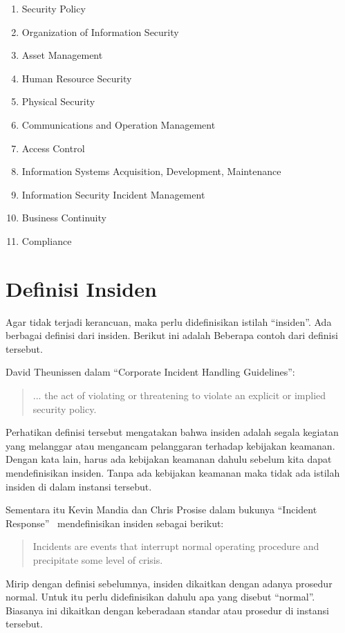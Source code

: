 \begin{enumerate}
\item Security Policy
\item Organization of Information Security
\item Asset Management
\item Human Resource Security
\item Physical Security
\item Communications and Operation Management
\item Access Control
\item Information Systems Acquisition, Development, Maintenance
\item Information Security Incident Management
\item Business Continuity
\item Compliance
\end{enumerate}

\section{Definisi Insiden}
Agar tidak terjadi kerancuan, maka perlu didefinisikan istilah ``insiden''.
Ada berbagai definisi dari insiden. Berikut ini adalah Beberapa
contoh dari definisi tersebut.

David Theunissen dalam ``Corporate Incident Handling Guidelines'':
\begin{quote}
... the act of violating or threatening to violate an explicit or 
implied security policy.
\end{quote}
Perhatikan definisi tersebut mengatakan bahwa insiden adalah segala
kegiatan yang melanggar atau mengancam pelanggaran terhadap
kebijakan keamanan. Dengan kata lain, harus ada kebijakan keamanan
dahulu sebelum kita dapat mendefinisikan insiden.
Tanpa ada kebijakan keamanan maka tidak ada istilah insiden di
dalam instansi tersebut.


Sementara itu Kevin Mandia dan Chris Prosise dalam bukunya
``Incident Response''~\cite{mandiaincident} mendefinisikan insiden sebagai berikut:
\begin{quote}
   Incidents are events that interrupt normal operating procedure
   and precipitate some level of crisis.
\end{quote}
Mirip dengan definisi sebelumnya, insiden dikaitkan dengan adanya
prosedur normal. Untuk itu perlu didefinisikan dahulu apa yang
disebut ``normal''. Biasanya ini dikaitkan dengan keberadaan
standar atau prosedur di instansi tersebut.


